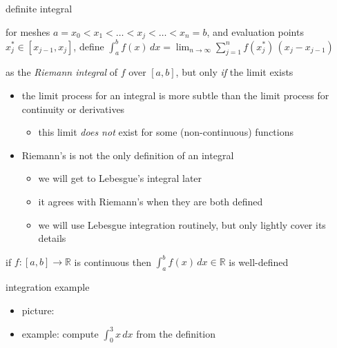 \documentclass[10pt,
               svgnames,
               hyperref={colorlinks,citecolor=DeepPink4,linkcolor=FireBrick,urlcolor=Maroon},
               usepdftitle=false]{beamer}
\newcommand{\RR}{\mathbb{R}}
\newcommand{\ds}{\displaystyle}
\begin{document}
\begin{frame}{definite integral}

\begin{definition}
for meshes $a = x_0 < x_1 < \dots < x_j < \dots < x_n = b$, and evaluation points $x_j^* \in [x_{j-1},x_j]$, define \quad $\ds \int_a^b f(x)\,dx = \lim_{n\to\infty} \sum_{j=1}^n f(x_j^*)\,(x_j - x_{j-1})$

as the \emph{Riemann integral} of $f$ over $[a,b]$, but only \emph{if} the limit exists
\end{definition}

\begin{itemize}
\item the limit process for an integral is more subtle than the limit process for continuity or derivatives
    \begin{itemize}
    \item[$\circ$] this limit \emph{does not} exist for some (non-continuous) functions
    \end{itemize}
\item Riemann's is not the only definition of an integral
    \begin{itemize}
    \item[$\circ$] we will get to Lebesgue's integral later
    \item[$\circ$] it agrees with Riemann's when they are both defined
    \item[$\circ$] we will use Lebesgue integration routinely, but only lightly cover its details
    \end{itemize}
\end{itemize}

\begin{theorem}
if $f:[a,b] \to \RR$ is continuous then $\ds \int_a^b f(x)\,dx \in \RR$ is well-defined
\end{theorem}
\end{frame}


\begin{frame}{integration example}

\begin{itemize}
\item picture:

\vspace{20mm}

\item example: compute $\int_0^3 x\, dx$ from the definition

\vspace{45mm}
\end{itemize}
\end{frame}
\end{document}
